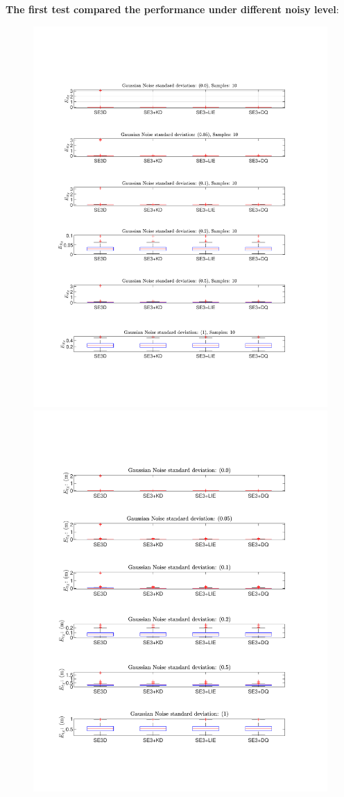 \textbf{The first test compared the performance under different noisy level}:
\begin{figure}
\centering
\includegraphics[scale=0.4]{./hand_eye_figures/se3/r_vs_noise}
\includegraphics[scale=0.4]{./hand_eye_figures/se3/t_vs_noise}

\end{figure}

